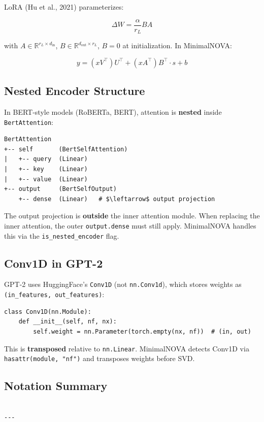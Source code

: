 LoRA (Hu et al., 2021) parameterizes:

\[
\Delta W = \frac{\alpha}{r_L} B A
\tag{3.10}
\]

with $A \in \mathbb{R}^{r_L \times d_\text{in}}$, $B \in \mathbb{R}^{d_\text{out} \times r_L}$, 
$B = 0$ at initialization. In MinimalNOVA:

\[
y = (x V^\top) U^\top + (x A^\top) B^\top \cdot s + b
\tag{3.11}
\]

\subsection{Nested Encoder Structure}

In BERT-style models (RoBERTa, BERT), attention is \textbf{nested} inside 
\texttt{BertAttention}:

\begin{lstlisting}
BertAttention
+-- self       (BertSelfAttention)
|   +-- query  (Linear)
|   +-- key    (Linear)
|   +-- value  (Linear)
+-- output     (BertSelfOutput)
    +-- dense  (Linear)   # $\leftarrow$ output projection
\end{lstlisting}

The output projection is \textbf{outside} the inner attention module. When 
replacing the inner attention, the outer \texttt{output.dense} must still apply. 
MinimalNOVA handles this via the \texttt{is\_nested\_encoder} flag.

\subsection{Conv1D in GPT-2}

GPT-2 uses HuggingFace's \texttt{Conv1D} (not \texttt{nn.Conv1d}), which stores weights 
as \texttt{(in\_features, out\_features)}:

\begin{lstlisting}
class Conv1D(nn.Module):
    def __init__(self, nf, nx):
        self.weight = nn.Parameter(torch.empty(nx, nf))  # (in, out)
\end{lstlisting}

This is \textbf{transposed} relative to \texttt{nn.Linear}. MinimalNOVA detects Conv1D 
via \texttt{hasattr(module, "nf")} and transposes weights before SVD.

\subsection{Notation Summary}

\begin{lstlisting}

---
\end{lstlisting}